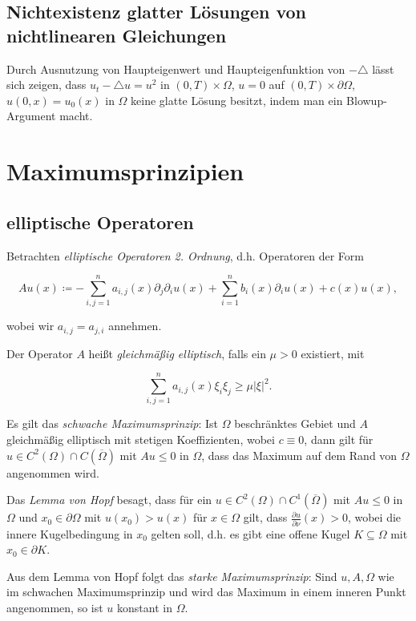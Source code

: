 \documentclass[11pt,a4paper]{scrartcl}
\newcommand{\laplace}{\triangle}
\theoremstyle{plain}
\theoremstyle{definition}
\theoremstyle{remark}
\begin{document}
\subsection{Nichtexistenz glatter Lösungen von nichtlinearen Gleichungen}

Durch Ausnutzung von Haupteigenwert und Haupteigenfunktion von $-\laplace$ lässt sich zeigen, dass $u_t -\laplace u = u^2$ in $(0,T)\times \Omega$, $u=0$ auf $(0,T)\times \partial\Omega$, $u(0,x)=u_0(x)$ in $\Omega$ keine glatte Lösung besitzt, indem man ein Blowup-Argument macht.

\section{Maximumsprinzipien}

\subsection{elliptische Operatoren}

Betrachten \emph{elliptische Operatoren 2. Ordnung}, d.h. Operatoren der Form

$$Au(x)\coloneqq -\sum_{i,j=1}^n a_{i,j}(x)\partial_j \partial_i u(x) + \sum_{i=1}^n b_i(x) \partial_i u(x) +c(x) u(x),$$

wobei wir $a_{i,j}=a_{j,i}$ annehmen.

Der Operator $A$ heißt \emph{gleichmäßig elliptisch}, falls ein $\mu > 0$ existiert, mit

$$\sum_{i,j=1}^n a_{i,j}(x)\xi_i\xi_j \geq \mu |\xi|^2.$$

Es gilt das \emph{schwache Maximumsprinzip}: Ist $\Omega$ beschränktes Gebiet und $A$ gleichmäßig elliptisch mit stetigen Koeffizienten, wobei $c\equiv 0$, dann gilt für $u\in C^2(\Omega) \cap C(\overline{\Omega})$ mit $Au \leq 0$ in $\Omega$, dass das Maximum auf dem Rand von $\Omega$ angenommen wird.

Das \emph{Lemma von Hopf} besagt, dass für ein $u\in C^2(\Omega) \cap C^1(\overline{\Omega})$ mit $Au\leq 0$ in $\Omega$ und $x_0\in \partial\Omega$ mit $u(x_0) > u(x)$ für $x\in \Omega$ gilt, dass $\frac{\partial u}{\partial \nu}(x) > 0$, wobei die innere Kugelbedingung in $x_0$ gelten soll, d.h. es gibt eine offene Kugel $K\subseteq \Omega$ mit $x_0 \in \partial K$.

Aus dem Lemma von Hopf folgt das \emph{starke Maximumsprinzip}: Sind $u,A,\Omega$ wie im schwachen Maximumsprinzip und wird das Maximum in einem inneren Punkt angenommen, so ist $u$ konstant in $\Omega$.
\end{document}
